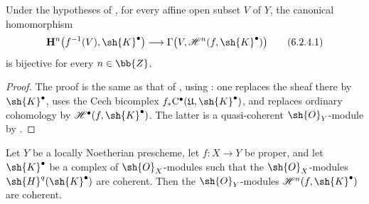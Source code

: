 \begin{corollary}[6.2.4]
\label{III.6.2.4}
Under the hypotheses of , for every affine open
subset $V$ of $Y$, the canonical homomorphism
\[
  \mathbf{H}^n\bigl(f^{-1}(V),\sh{K}^\bullet\bigr)
  \longrightarrow
  \Gamma\bigl(V,\mathcal{H}^n(f,\sh{K}^\bullet)\bigr)
  \tag{6.2.4.1}\label{III.6.2.4.1}
\]
is bijective for every $n\in\bb{Z}$.
\end{corollary}

\begin{proof}
The proof is the same as that of , using
: one replaces the sheaf there by
$\sh{K}^\bullet$, uses the Cech bicomplex
$f_*\mathrm{C}^\bullet(\mathfrak{U},\sh{K}^\bullet)$, and replaces
ordinary cohomology by
$\mathcal{H}^\bullet(f,\sh{K}^\bullet)$.  The latter is a
quasi-coherent $\sh{O}_Y$-module by .
\end{proof}

\begin{proposition}[6.2.5]
\label{III.6.2.5}
Let $Y$ be a locally Noetherian prescheme, let $f:X\to Y$ be
proper, and let $\sh{K}^\bullet$ be a complex of
$\sh{O}_X$-modules such that the $\sh{O}_X$-modules
$\sh{H}^q(\sh{K}^\bullet)$ are coherent.  Then the
$\sh{O}_Y$-modules $\mathcal{H}^n(f,\sh{K}^\bullet)$ are
coherent.
\end{proposition}

